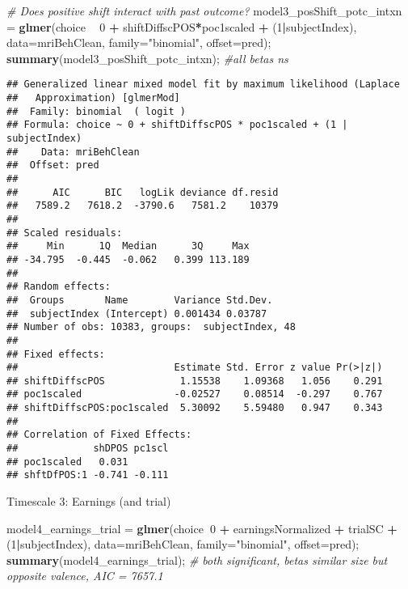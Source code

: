 \documentclass[]{article}
\newenvironment{Shaded}{\begin{snugshade}}{\end{snugshade}}
\newcommand{\CommentTok}[1]{\textcolor[rgb]{0.56,0.35,0.01}{\textit{#1}}}
\newcommand{\DataTypeTok}[1]{\textcolor[rgb]{0.13,0.29,0.53}{#1}}
\newcommand{\DecValTok}[1]{\textcolor[rgb]{0.00,0.00,0.81}{#1}}
\newcommand{\KeywordTok}[1]{\textcolor[rgb]{0.13,0.29,0.53}{\textbf{#1}}}
\newcommand{\NormalTok}[1]{#1}
\newcommand{\OperatorTok}[1]{\textcolor[rgb]{0.81,0.36,0.00}{\textbf{#1}}}
\newcommand{\StringTok}[1]{\textcolor[rgb]{0.31,0.60,0.02}{#1}}
\begin{document}
\begin{Shaded}
\begin{Highlighting}[]
\CommentTok{# Does positive shift interact with past outcome?}
\NormalTok{model3_posShift_potc_intxn =}\StringTok{ }\KeywordTok{glmer}\NormalTok{(choice }\OperatorTok{~}\StringTok{ }\DecValTok{0} \OperatorTok{+}\StringTok{ }\NormalTok{shiftDiffscPOS}\OperatorTok{*}\NormalTok{poc1scaled }\OperatorTok{+}\StringTok{ }\NormalTok{(}\DecValTok{1}\OperatorTok{|}\NormalTok{subjectIndex), }\DataTypeTok{data=}\NormalTok{mriBehClean, }\DataTypeTok{family=}\StringTok{"binomial"}\NormalTok{, }\DataTypeTok{offset=}\NormalTok{pred);}
\KeywordTok{summary}\NormalTok{(model3_posShift_potc_intxn); }\CommentTok{#all betas ns}
\end{Highlighting}
\end{Shaded}

\begin{verbatim}
## Generalized linear mixed model fit by maximum likelihood (Laplace
##   Approximation) [glmerMod]
##  Family: binomial  ( logit )
## Formula: choice ~ 0 + shiftDiffscPOS * poc1scaled + (1 | subjectIndex)
##    Data: mriBehClean
##  Offset: pred
## 
##      AIC      BIC   logLik deviance df.resid 
##   7589.2   7618.2  -3790.6   7581.2    10379 
## 
## Scaled residuals: 
##     Min      1Q  Median      3Q     Max 
## -34.795  -0.445  -0.062   0.399 113.189 
## 
## Random effects:
##  Groups       Name        Variance Std.Dev.
##  subjectIndex (Intercept) 0.001434 0.03787 
## Number of obs: 10383, groups:  subjectIndex, 48
## 
## Fixed effects:
##                           Estimate Std. Error z value Pr(>|z|)
## shiftDiffscPOS             1.15538    1.09368   1.056    0.291
## poc1scaled                -0.02527    0.08514  -0.297    0.767
## shiftDiffscPOS:poc1scaled  5.30092    5.59480   0.947    0.343
## 
## Correlation of Fixed Effects:
##             shDPOS pc1scl
## poc1scaled   0.031       
## shftDfPOS:1 -0.741 -0.111
\end{verbatim}

Timescale 3: Earnings (and trial)

\begin{Shaded}
\begin{Highlighting}[]
\NormalTok{model4_earnings_trial =}\StringTok{ }\KeywordTok{glmer}\NormalTok{(choice}\OperatorTok{~}\DecValTok{0} \OperatorTok{+}\StringTok{ }\NormalTok{earningsNormalized }\OperatorTok{+}\StringTok{ }\NormalTok{trialSC }\OperatorTok{+}\StringTok{ }\NormalTok{(}\DecValTok{1}\OperatorTok{|}\NormalTok{subjectIndex), }\DataTypeTok{data=}\NormalTok{mriBehClean, }\DataTypeTok{family=}\StringTok{"binomial"}\NormalTok{, }\DataTypeTok{offset=}\NormalTok{pred);}
\KeywordTok{summary}\NormalTok{(model4_earnings_trial); }\CommentTok{# both significant, betas similar size but opposite valence, AIC = 7657.1 }
\end{Highlighting}
\end{Shaded}
\end{document}

